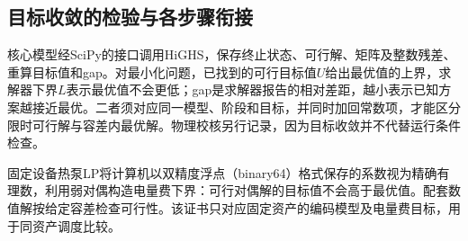 \subsection{目标收敛的检验与各步骤衔接}

核心模型经SciPy的接口调用HiGHS，保存终止状态、可行解、矩阵及整数残差、重算目标值和gap。对最小化问题，已找到的可行目标值$U$给出最优值的上界，求解器下界$L$表示最优值不会更低；gap是求解器报告的相对差距，越小表示已知方案越接近最优。二者须对应同一模型、阶段和目标，并同时加回常数项，才能区分限时可行解与容差内最优解。物理校核另行记录，因为目标收敛并不代替运行条件检查。

固定设备热泵LP将计算机以双精度浮点（binary64）格式保存的系数视为精确有理数，利用弱对偶构造电量费下界：可行对偶解的目标值不会高于最优值。配套数值解按给定容差检查可行性。该证书只对应固定资产的编码模型及电量费目标，用于同资产调度比较。
